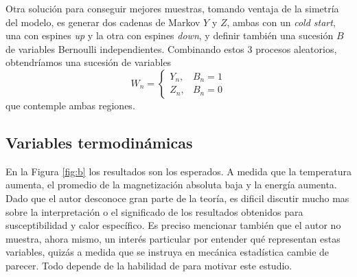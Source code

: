 \documentclass[a4paper,12pt]{article}
\begin{document}
Otra solución para conseguir mejores muestras, tomando ventaja de la simetría del modelo, es generar dos cadenas de Markov $Y$ y $Z$, ambas con un {\it cold start}, una con espines {\it up} y la otra con espines {\it down}, y definir también una sucesión $B$ de variables Bernoulli independientes. Combinando estos 3 procesos aleatorios, obtendríamos una sucesión de variables
\begin{equation}
    W_n =
    \begin{cases}
        Y_n, & B_n = 1\\
        Z_n, & B_n = 0
    \end{cases}
\end{equation}
que contemple ambas regiones.

\subsection{Variables termodinámicas}

En la Figura \ref{fig:b} los resultados son los esperados. A medida que la temperatura aumenta, el promedio de la magnetización absoluta baja y la energía aumenta. Dado que el autor desconoce gran parte de la teoría, es dificil discutir mucho mas sobre la interpretación o el significado de los resultados obtenidos para susceptibilidad y calor específico. Es preciso mencionar también que el autor no muestra, ahora mismo, un interés particular por entender qué representan estas variables, quizás a medida que se instruya en mecánica estadística cambie de parecer. Todo depende de la habilidad de \cite{phillies2000elementary} para motivar este estudio.\\
\end{document}
